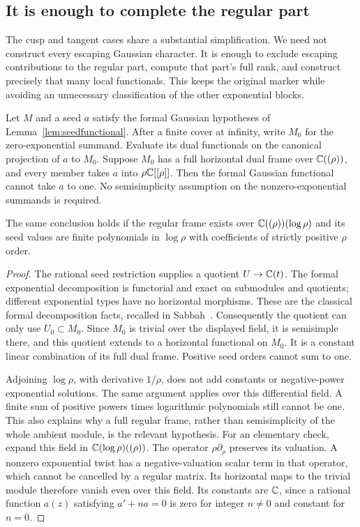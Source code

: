 \subsection{It is enough to complete the regular part}
\label{sec:boundedregular}

The cusp and tangent cases share a substantial simplification.
We need not construct every escaping Gaussian character. It is
enough to exclude escaping contributions to the regular part,
compute that part's full rank, and construct precisely that many
local functionals. This keeps the original marker while avoiding
an unnecessary classification of the other exponential blocks.

\begin{lemma}
\label{lem:regularpositiveseed}
Let $M$ and a seed $a$ satisfy the formal Gaussian hypotheses of
Lemma~\ref{lem:seedfunctional}. After a finite cover at infinity,
write $M_0$ for the zero-exponential summand. Evaluate its dual
functionals on the canonical projection of $a$ to $M_0$. Suppose $M_0$ has a
full horizontal dual frame over $\mathbb C((\rho))$, and every member
takes $a$ into $\rho\mathbb C[[\rho]]$. Then the formal Gaussian
functional cannot take $a$ to one. No semisimplicity assumption
on the nonzero-exponential summands is required.

The same conclusion holds if the regular frame exists over
$\mathbb C((\rho))(\log\rho)$ and its seed values are finite
polynomials in $\log\rho$ with coefficients of strictly positive
$\rho$ order.
\end{lemma}
\begin{proof}
The rational seed restriction supplies a quotient $U\to\mathbb C(t)$.
The formal exponential decomposition is functorial and exact on
submodules and quotients; different exponential types have no
horizontal morphisms. These are the classical formal decomposition
facts, recalled in Sabbah~\cite[Section~3, Corollary~3.3 and its
proof]{SabbahStationary}. Consequently the quotient can only use
$U_0\subset M_0$. Since $M_0$ is trivial over the displayed field,
it is semisimple there, and this quotient extends to a horizontal
functional on $M_0$. It is a constant linear combination of its
full dual frame. Positive seed orders cannot sum to one.

Adjoining $\log\rho$, with derivative $1/\rho$, does not add
constants or negative-power exponential solutions. The same
argument applies over this differential field. A finite sum of
positive powers times logarithmic polynomials still cannot be
one. This also explains why a full regular frame, rather than
semisimplicity of the whole ambient module, is the relevant
hypothesis.
For an elementary check, expand this field in
$\mathbb C(\log\rho)((\rho))$. The operator $\rho\partial_\rho$
preserves its valuation. A nonzero exponential twist has a
negative-valuation scalar term in that operator, which cannot
be cancelled by a regular matrix. Its horizontal maps to the
trivial module therefore vanish even over this field. Its
constants are $\mathbb C$, since a rational function $a(z)$ satisfying
$a'+na=0$ is zero for integer $n\ne0$ and constant for $n=0$.
\end{proof}


